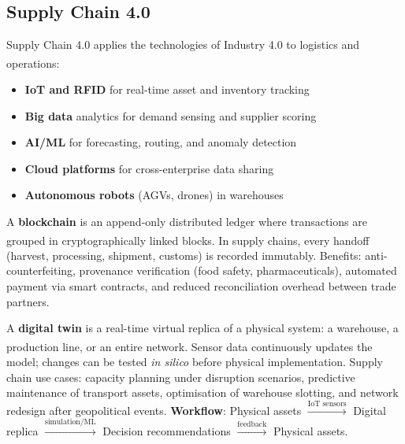 \subsection{Supply Chain 4.0}

\begin{tcbitemize}[ skin=sectionraster ]

    \tcbitem[title={Supply Chain 4.0: Digital Transformation}, raster multicolumn=3]
    Supply Chain 4.0 applies the technologies of Industry 4.0 to logistics and operations\textsuperscript{\cite[][pp.~17--22]{chopraSupplyChainManagement2019}}:
    \begin{itemize}
        \item \textbf{IoT and RFID} for real-time asset and inventory tracking
        \item \textbf{Big data} analytics for demand sensing and supplier scoring
        \item \textbf{AI/ML} for forecasting, routing, and anomaly detection
        \item \textbf{Cloud platforms} for cross-enterprise data sharing
        \item \textbf{Autonomous robots} (AGVs, drones) in warehouses
    \end{itemize}

    \tcbitem[title=Blockchain for Traceability, raster multicolumn=3]
    A \textbf{blockchain} is an append-only distributed ledger where transactions are grouped in cryptographically linked blocks\textsuperscript{\cite[][pp.~8--9]{chopraSupplyChainManagement2019}}.
    In supply chains, every handoff (harvest, processing, shipment, customs) is recorded immutably.
    Benefits: anti-counterfeiting, provenance verification (food safety, pharmaceuticals), automated payment via smart contracts, and reduced reconciliation overhead between trade partners.

    \tcbitem[title=Digital Twins in Supply Chains, raster multicolumn=6]
    A \textbf{digital twin} is a real-time virtual replica of a physical system: a warehouse, a production line, or an entire network\textsuperscript{\cite[][pp.~2403--2405]{bocewiczDigitalTwinManufacturing2021}}.
    Sensor data continuously updates the model; changes can be tested \emph{in silico} before physical implementation.
    Supply chain use cases: capacity planning under disruption scenarios, predictive maintenance of transport assets, optimisation of warehouse slotting, and network redesign after geopolitical events.
    \tcblower
    \textbf{Workflow}: Physical assets $\xrightarrow{\text{IoT sensors}}$ Digital replica $\xrightarrow{\text{simulation/ML}}$ Decision recommendations $\xrightarrow{\text{feedback}}$ Physical assets.

\end{tcbitemize}

